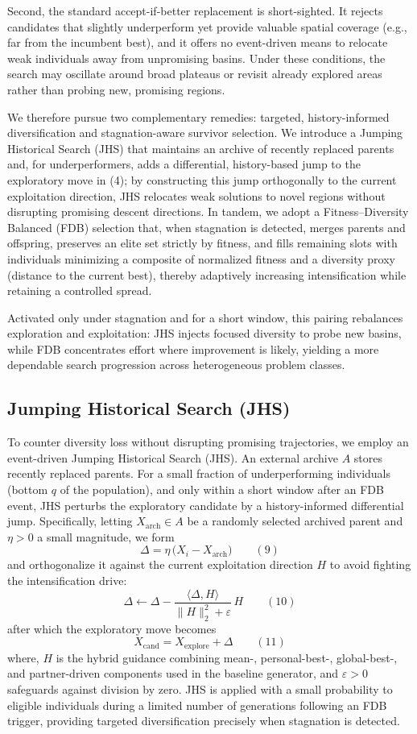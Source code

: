 \documentclass[3p]{elsarticle}
\begin{document}
Second, the standard accept-if-better replacement is short-sighted. It rejects candidates that slightly underperform yet provide valuable spatial coverage (e.g., far from the incumbent best), and it offers no event-driven means to relocate weak individuals away from unpromising basins. Under these conditions, the search may oscillate around broad plateaus or revisit already explored areas rather than probing new, promising regions.

We therefore pursue two complementary remedies: targeted, history-informed diversification and stagnation-aware survivor selection. We introduce a Jumping Historical Search (JHS) that maintains an archive of recently replaced parents and, for underperformers, adds a differential, history-based jump to the exploratory move in (4); by constructing this jump orthogonally to the current exploitation direction, JHS relocates weak solutions to novel regions without disrupting promising descent directions. In tandem, we adopt a Fitness–Diversity Balanced (FDB) selection that, when stagnation is detected, merges parents and offspring, preserves an elite set strictly by fitness, and fills remaining slots with individuals minimizing a composite of normalized fitness and a diversity proxy (distance to the current best), thereby adaptively increasing intensification while retaining a controlled spread.

Activated only under stagnation and for a short window, this pairing rebalances exploration and exploitation: JHS injects focused diversity to probe new basins, while FDB concentrates effort where improvement is likely, yielding a more dependable search progression across heterogeneous problem classes.

\subsection{Jumping Historical Search (JHS)}
To counter diversity loss without disrupting promising trajectories, we employ an event-driven Jumping Historical Search (JHS). An external archive \(A\) stores recently replaced parents. For a small fraction of underperforming individuals (bottom \(q\) of the population), and only within a short window after an FDB event, JHS perturbs the exploratory candidate by a history-informed differential jump. Specifically, letting \(X_{\!\text{arch}}\in A\) be a randomly selected archived parent and \(\eta>0\) a small magnitude, we form
\[ \Delta = \eta\,\bigl(X_i - X_{\!\text{arch}}\bigr) \qquad(9) \]
and orthogonalize it against the current exploitation direction \(H\) to avoid fighting the intensification drive:
\[ \Delta \leftarrow \Delta - \frac{\langle \Delta, H \rangle}{\lVert H \rVert_2^2 + \varepsilon}\,H \qquad(10) \]
after which the exploratory move becomes
\[ X_{\mathrm{cand}} = X_{\mathrm{explore}} + \Delta \qquad(11) \]
where, \(H\) is the hybrid guidance combining mean-, personal-best-, global-best-, and partner-driven components used in the baseline generator, and \(\varepsilon>0\) safeguards against division by zero. JHS is applied with a small probability to eligible individuals during a limited number of generations following an FDB trigger, providing targeted diversification precisely when stagnation is detected.
\end{document}
